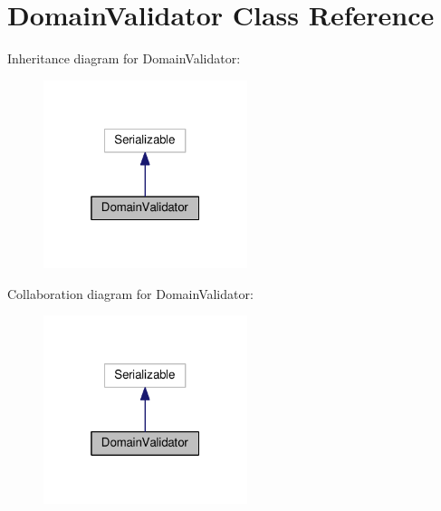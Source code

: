 \hypertarget{classDomainValidator}{}\section{Domain\+Validator Class Reference}
\label{classDomainValidator}


Inheritance diagram for Domain\+Validator\+:\nopagebreak
\begin{figure}[H]
\begin{center}
\leavevmode
\includegraphics[width=169pt]{classDomainValidator__inherit__graph}
\end{center}
\end{figure}


Collaboration diagram for Domain\+Validator\+:\nopagebreak
\begin{figure}[H]
\begin{center}
\leavevmode
\includegraphics[width=169pt]{classDomainValidator__coll__graph}
\end{center}
\end{figure}
